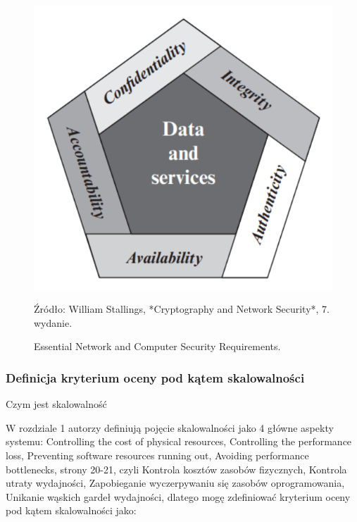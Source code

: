 \documentclass[runningheads,12pt]{llncs}
\begin{document}
\begin{figure}
    \includegraphics[width=\linewidth]{images/image-security.png}
    \caption{Essential Network and Computer Security Requirements.} \label{fig1}
    \vspace{0.5em}
    \begin{center}
        {\small Źródło: William Stallings, *Cryptography and Network Security*, 7. wydanie.}
    \end{center}
\end{figure}

\subsubsection{Definicja kryterium oceny pod kątem skalowalności}

Czym jest skalowalność

W rozdziale 1 autorzy definiują pojęcie skalowalności jako 4 główne aspekty systemu: Controlling the cost of physical resources, Controlling the performance loss, Preventing software resources running out, Avoiding performance bottlenecks, strony 20-21, czyli Kontrola kosztów zasobów fizycznych, Kontrola utraty wydajności, Zapobieganie wyczerpywaniu się zasobów oprogramowania, Unikanie wąskich gardeł wydajności, dlatego mogę zdefiniować kryterium oceny pod kątem skalowalności jako: ~\cite[p. 21]{coulouris2011distributed}
\end{document}
